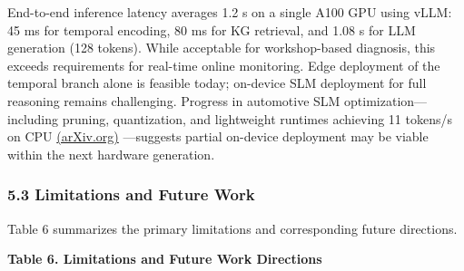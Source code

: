 \documentclass[
  11pt,
]{article}
\begin{document}
End-to-end inference latency averages 1.2 s on a single A100 GPU using
vLLM: 45 ms for temporal encoding, 80 ms for KG retrieval, and 1.08 s
for LLM generation (128 tokens). While acceptable for workshop-based
diagnosis, this exceeds requirements for real-time online monitoring.
Edge deployment of the temporal branch alone is feasible today;
on-device SLM deployment for full reasoning remains challenging.
Progress in automotive SLM optimization---including pruning,
quantization, and lightweight runtimes achieving 11 tokens/s on CPU
\href{https://arxiv.org/html/2501.02342v1}{(arXiv.org)} ---suggests
partial on-device deployment may be viable within the next hardware
generation.

\subsubsection{5.3 Limitations and Future
Work}\label{limitations-and-future-work}

Table 6 summarizes the primary limitations and corresponding future
directions.

\textbf{Table 6. Limitations and Future Work Directions}
\end{document}
